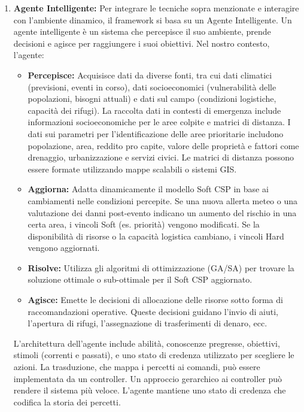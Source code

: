\documentclass{article}
\begin{document}
\begin{enumerate}
    \item \textbf{Agente Intelligente:} Per integrare le tecniche sopra menzionate e interagire con l'ambiente dinamico, il framework si basa su un Agente Intelligente. Un agente intelligente è un sistema che percepisce il suo ambiente, prende decisioni e agisce per raggiungere i suoi obiettivi. Nel nostro contesto, l'agente:
    \begin{itemize}
        \item \textbf{Percepisce:} Acquisisce dati da diverse fonti, tra cui dati climatici (previsioni, eventi in corso), dati socioeconomici (vulnerabilità delle popolazioni, bisogni attuali) e dati sul campo (condizioni logistiche, capacità dei rifugi). La raccolta dati in contesti di emergenza include informazioni socioeconomiche per le aree colpite e matrici di distanza. I dati sui parametri per l'identificazione delle aree prioritarie includono popolazione, area, reddito pro capite, valore delle proprietà e fattori come drenaggio, urbanizzazione e servizi civici. Le matrici di distanza possono essere formate utilizzando mappe scalabili o sistemi GIS.
        \item \textbf{Aggiorna:} Adatta dinamicamente il modello Soft CSP in base ai cambiamenti nelle condizioni percepite. Se una nuova allerta meteo o una valutazione dei danni post-evento indicano un aumento del rischio in una certa area, i vincoli Soft (es. priorità) vengono modificati. Se la disponibilità di risorse o la capacità logistica cambiano, i vincoli Hard vengono aggiornati.
        \item \textbf{Risolve:} Utilizza gli algoritmi di ottimizzazione (GA/SA) per trovare la soluzione ottimale o sub-ottimale per il Soft CSP aggiornato.
        \item \textbf{Agisce:} Emette le decisioni di allocazione delle risorse sotto forma di raccomandazioni operative. Queste decisioni guidano l'invio di aiuti, l'apertura di rifugi, l'assegnazione di trasferimenti di denaro, ecc.
    \end{itemize}
    L'architettura dell'agente include abilità, conoscenze pregresse, obiettivi, stimoli (correnti e passati), e uno stato di credenza utilizzato per scegliere le azioni. La trasduzione, che mappa i percetti ai comandi, può essere implementata da un controller. Un approccio gerarchico ai controller può rendere il sistema più veloce. L'agente mantiene uno stato di credenza che codifica la storia dei percetti.
\end{enumerate}
\end{document}
